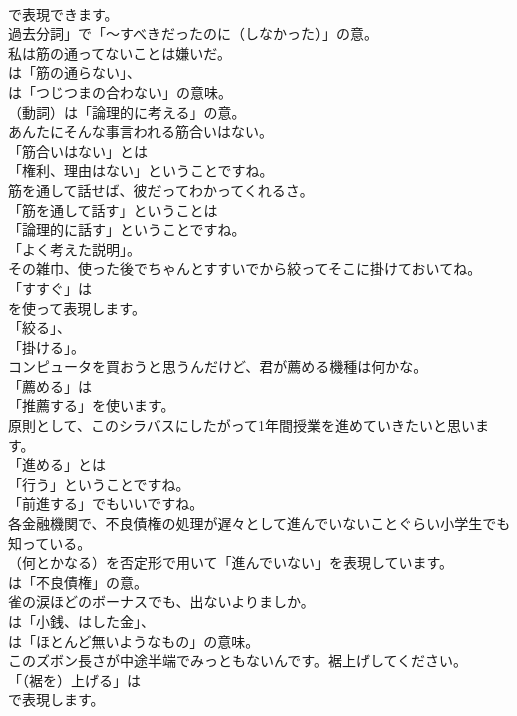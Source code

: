 \documentclass[8pt]{extreport}
\begin{document}
\begin{CJK}{UTF8}{min}
\\	で表現できます。
\\	過去分詞」で「～すべきだったのに（しなかった）」の意。	
\\	私は筋の通ってないことは嫌いだ。 
\\	は「筋の通らない」、
\\	は「つじつまの合わない」の意味。
\\	（動詞）は「論理的に考える」の意。	
\\	あんたにそんな事言われる筋合いはない。 
\\	「筋合いはない」とは
\\	「権利、理由はない」ということですね。	
\\	筋を通して話せば、彼だってわかってくれるさ。 
\\	「筋を通して話す」ということは
\\	「論理的に話す」ということですね。
\\	「よく考えた説明」。	
\\	その雑巾、使った後でちゃんとすすいでから絞ってそこに掛けておいてね。 
\\	「すすぐ」は
\\	を使って表現します。
\\	「絞る」、
\\	「掛ける」。	
\\	コンピュータを買おうと思うんだけど、君が薦める機種は何かな。 
\\	「薦める」は
\\	「推薦する」を使います。	
\\	原則として、このシラバスにしたがって1年間授業を進めていきたいと思います。 
\\	「進める」とは
\\	「行う」ということですね。
\\	「前進する」でもいいですね。	
\\	各金融機関で、不良債権の処理が遅々として進んでいないことぐらい小学生でも知っている。 
\\	（何とかなる）を否定形で用いて「進んでいない」を表現しています。
\\	は「不良債権」の意。	
\\	雀の涙ほどのボーナスでも、出ないよりましか。 
\\	は「小銭、はした金」、
\\	は「ほとんど無いようなもの」の意味。	
\\	このズボン長さが中途半端でみっともないんです。裾上げしてください。 
\\	「（裾を）上げる」は 
\\	で表現します。

\end{CJK}
\end{document}
